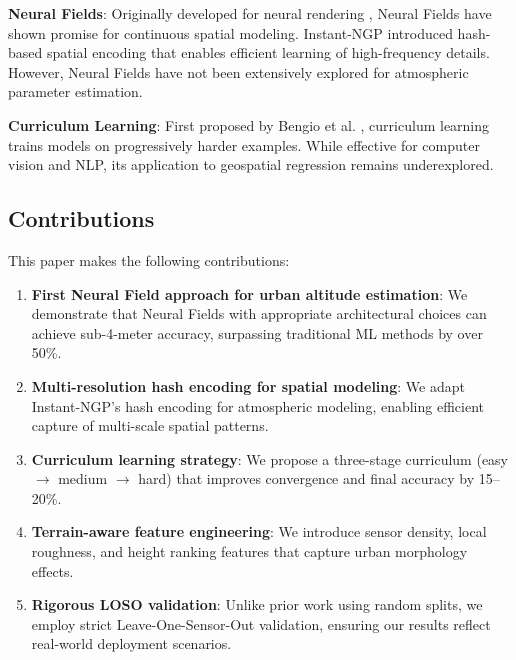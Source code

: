 \textbf{Neural Fields}: Originally developed for neural rendering \cite{mildenhall2020nerf}, Neural Fields have shown promise for continuous spatial modeling. Instant-NGP \cite{muller2022instant} introduced hash-based spatial encoding that enables efficient learning of high-frequency details. However, Neural Fields have not been extensively explored for atmospheric parameter estimation.

\textbf{Curriculum Learning}: First proposed by Bengio et al. \cite{bengio2009curriculum}, curriculum learning trains models on progressively harder examples. While effective for computer vision and NLP, its application to geospatial regression remains underexplored.

\subsection{Contributions}

This paper makes the following contributions:

\begin{enumerate}
    \item \textbf{First Neural Field approach for urban altitude estimation}: We demonstrate that Neural Fields with appropriate architectural choices can achieve sub-4-meter accuracy, surpassing traditional ML methods by over 50\%.
    
    \item \textbf{Multi-resolution hash encoding for spatial modeling}: We adapt Instant-NGP's hash encoding for atmospheric modeling, enabling efficient capture of multi-scale spatial patterns.
    
    \item \textbf{Curriculum learning strategy}: We propose a three-stage curriculum (easy $\rightarrow$ medium $\rightarrow$ hard) that improves convergence and final accuracy by 15--20\%.
    
    \item \textbf{Terrain-aware feature engineering}: We introduce sensor density, local roughness, and height ranking features that capture urban morphology effects.
    
    \item \textbf{Rigorous LOSO validation}: Unlike prior work using random splits, we employ strict Leave-One-Sensor-Out validation, ensuring our results reflect real-world deployment scenarios.
\end{enumerate}